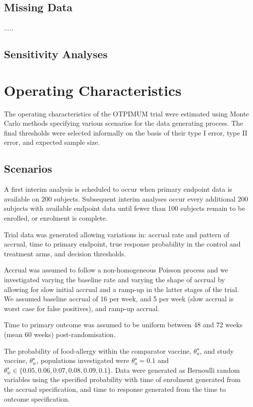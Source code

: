 \documentclass{bmcart}
\begin{document}
\subsection*{Missing Data}

.....

\subsection*{Sensitivity Analyses}



\section*{Operating Characteristics}

The operating characteristics of the OTPIMUM trial were estimated using Monte Carlo methods specifying various scenarios for the data generating process. The final thresholds were selected informally on the basis of their type I error, type II error, and expected sample size.

\subsection*{Scenarios}

A first interim analysis is scheduled to occur when primary endpoint data is available on 200 subjects.
Subsequent interim analyses occur every additional 200 subjects with available endpoint data until fewer than 100 subjects remain to be enrolled, or enrolment is complete.

Trial data was generated allowing variations in: accrual rate and pattern of accrual, time to primary endpoint, true response probability in the control and treatment arms, and decision thresholds.

Accrual was assumed to follow a non-homogeneous Poisson process and we investigated varying the baseline rate and varying the shape of accrual by allowing for slow initial accrual and a ramp-up in the latter stages of the trial.
We assumed baseline accrual of 16 per week, and 5 per week (slow accrual is worst case for false positives), and ramp-up accrual.

Time to primary outcome was assumed to be uniform between 48 and 72 weeks (mean 60 weeks) post-randomisation.

The probability of food-allergy within the comparator vaccine, $\theta_a^\star$, and study vaccine, $\theta_w^\star$, populations investigated were $\theta_a^\star=0.1$ and $\theta_w^\star\in\{0.05, 0.06, 0.07, 0.08, 0.09,0.1\}$.
Data were generated as Bernoulli random variables using the specified probability with time of enrolment generated from the accrual specification, and time to response generated from the time to outcome specification.
\end{document}
